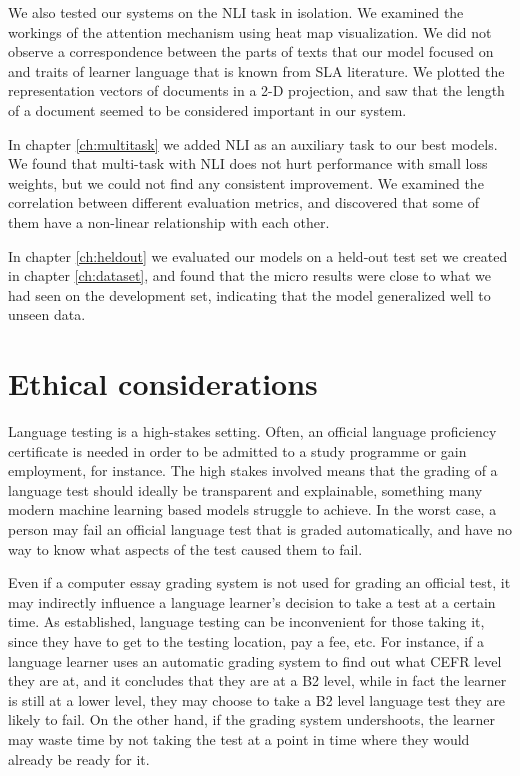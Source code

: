 We also tested our systems on the NLI task in isolation. We examined the
workings of the attention mechanism using heat map visualization. We did not
observe a correspondence between the parts of texts that our model focused on
and traits of learner language that is known from \ac{SLA} literature. We
plotted the representation vectors of documents in a 2-D projection, and saw
that the length of a document seemed to be considered important in our
system.

In chapter \ref{ch:multitask} we added \ac{NLI} as an auxiliary task to our
best models. We found that multi-task with NLI does not hurt performance with
small loss weights, but we could not find any consistent improvement. We
examined the correlation between different evaluation metrics, and discovered
that some of them have a non-linear relationship with each other.

In chapter \ref{ch:heldout} we evaluated our models on a held-out test set we
created in chapter \ref{ch:dataset}, and found that the micro \FI results
were close to what we had seen on the development set, indicating that the
model generalized well to unseen data.


\section{Ethical considerations}

Language testing is a high-stakes setting. Often, an official language
proficiency certificate is needed in order to be admitted to a study
programme or gain employment, for instance. The high stakes involved means
that the grading of a language test should ideally be transparent and
explainable, something many modern machine learning based models struggle to
achieve. In the worst case, a person may fail an official language test that
is graded automatically, and have no way to know what aspects of the test
caused them to fail.

Even if a computer essay grading system is not used for grading an official
test, it may indirectly influence a language learner's decision to take a
test at a certain time. As established, language testing can be inconvenient
for those taking it, since they have to get to the testing location, pay a
fee, etc. For instance, if a language learner uses an automatic grading
system to find out what CEFR level they are at, and it concludes that they
are at a B2 level, while in fact the learner is still at a lower level, they
may choose to take a B2 level language test they are likely to fail. On the
other hand, if the grading system undershoots, the learner may waste time by
not taking the test at a point in time where they would already be ready for
it.

